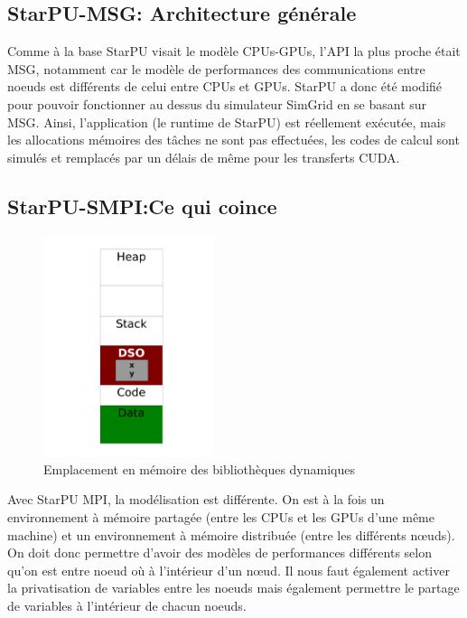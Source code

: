 \documentclass[smallextended]{svjour3}
\begin{document}
\subsection{StarPU-MSG: Architecture générale}
\label{sec-3-2}
Comme à la base StarPU visait le modèle CPUs-GPUs, l'API la plus
proche était MSG, notamment car le modèle de performances des
communications entre noeuds est différents de celui entre CPUs et
GPUs. StarPU a donc été modifié pour pouvoir fonctionner au dessus
du simulateur SimGrid en se basant sur MSG. Ainsi, l'application
(le runtime de StarPU) est réellement exécutée, mais les
allocations mémoires des tâches ne sont pas effectuées, les codes
de calcul sont simulés et remplacés par un délais de même pour les
transferts CUDA.  

\subsection{StarPU-SMPI:Ce qui coince}
\label{sec-3-3}

\begin{figure}
\vspace{-15mm}
\begin{center}
\includegraphics[width=5cm]{./Img/Dyn.pdf}
\end{center}
\caption{\label{fig:4}Emplacement en mémoire des bibliothèques dynamiques}
\end{figure}

Avec StarPU MPI, la modélisation est différente. On est à la fois
un environnement à mémoire partagée (entre les CPUs et les GPUs
d'une même machine) et un environnement à mémoire distribuée
(entre les différents nœuds). On doit donc permettre d'avoir des
modèles de performances différents selon qu'on est entre noeud où à
l'intérieur d'un nœud. Il nous faut également activer la
privatisation de variables entre les noeuds mais également
permettre le partage de variables à l'intérieur de chacun noeuds. 
\end{document}
